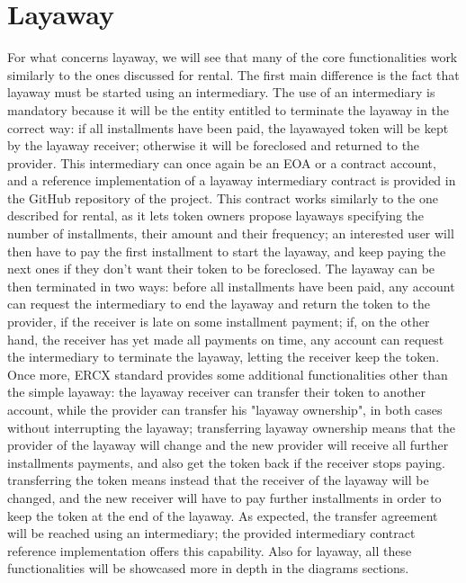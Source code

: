 \documentclass[english, LaM, oneside]{sapthesis}%
\begin{document}
\section{Layaway}
For what concerns layaway, we will see that many of the core functionalities work similarly to the ones discussed for rental. \newline
The first main difference is the fact that layaway must be started using an intermediary. The use of an intermediary is mandatory because it will be the entity entitled to terminate the layaway in the correct way: if all installments have been paid, the layawayed token will be kept by the layaway receiver; otherwise it will be foreclosed and returned to the provider. This intermediary can once again be an EOA or a contract account, and a reference implementation of a layaway intermediary contract is provided in the GitHub repository of the project. This contract works similarly to the one described for rental, as it lets token owners propose layaways specifying the number of installments, their amount and their frequency; an interested user will then have to pay the first installment to start the layaway, and keep paying the next ones if they don't want their token to be foreclosed. The layaway can be then terminated in two ways: before all installments have been paid, any account can request the intermediary to end the layaway and return the token to the provider, if the receiver is late on some installment payment; if, on the other hand, the receiver has yet made all payments on time, any account can request the intermediary to terminate the layaway, letting the receiver keep the token. \newline
Once more, ERCX standard provides some additional functionalities other than the simple layaway: the layaway receiver can transfer their token to another account, while the provider can transfer his "layaway ownership", in both cases without interrupting the layaway; transferring layaway ownership means that the provider of the layaway will change and the new provider will receive all further installments payments, and also get the token back if the receiver stops paying. transferring the token means instead that the receiver of the layaway will be changed, and the new receiver will have to pay further installments in order to keep the token at the end of the layaway. As expected, the transfer agreement will be reached using an intermediary; the provided intermediary contract reference implementation offers this capability. \newline
Also for layaway, all these functionalities will be showcased more in depth in the diagrams sections.
\end{document}
